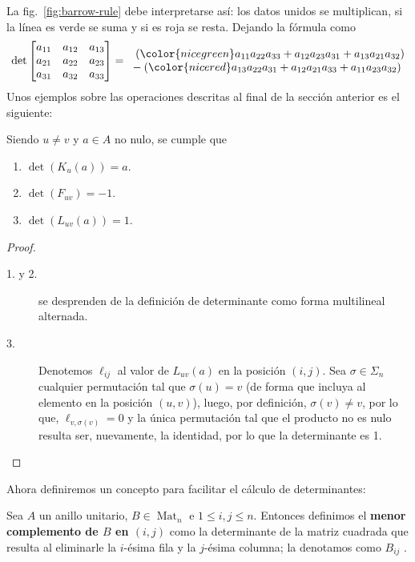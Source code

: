 \documentclass[11pt,oneside]{book}
\DeclareMathOperator{\Mat}{Mat}
\begin{document}
La fig.~\ref{fig:barrow-rule} debe interpretarse así: los datos unidos se multiplican, si la línea es verde se suma y si es roja se resta. Dejando la fórmula como
\begin{equation}
\det\begin{bmatrix}
a_{11} & a_{12} & a_{13} \\
a_{21} & a_{22} & a_{23} \\
a_{31} & a_{32} & a_{33}
\end{bmatrix}=
\begin{matrix}
\phantom{{}-}({\color{nicegreen}a_{11}a_{22}a_{33}+a_{12}a_{23}a_{31}+a_{13}a_{21}a_{32}})\\
{}-({\color{nicered}a_{13}a_{22}a_{31}+a_{12}a_{21}a_{33}+a_{11}a_{23}a_{32}})
\end{matrix}
\end{equation}
Unos ejemplos sobre las operaciones descritas al final de la sección anterior es el siguiente:
\begin{thm}
Siendo $u\neq v$ y $a\in A$ no nulo, se cumple que
	\begin{enumerate}
	\item $\det(K_u(a))=a$.
	\item $\det(F_{uv})=-1$.
	\item $\det(L_{uv}(a))=1$.
	\end{enumerate}
\end{thm}
\begin{proof}
	\begin{description}
	\item[1. y 2.] se desprenden de la definición de determinante como forma multilineal alternada.
	\item[3.] Denotemos $\ell_{ij}$ al valor de $L_{uv}(a)$ en la posición $(i,j)$. Sea $\sigma\in\Sigma_n$ cualquier permutación tal que $\sigma(u)=v$ (de forma que incluya al elemento en la posición $(u,v)$), luego, por definición, $\sigma(v)\neq v$, por lo que, $\ell_{v,\sigma(v)}=0$ y la única permutación tal que el producto no es nulo resulta ser, nuevamente, la identidad, por lo que la determinante es 1.
	\end{description}
\end{proof}
Ahora definiremos un concepto para facilitar el cálculo de determinantes:
\begin{mydef}
Sea $A$ un anillo unitario, $B\in\Mat_n$ e $1\leq i,j\leq n$. Entonces definimos el \textbf{menor complemento de $B$ en $(i,j)$} como la determinante de la matriz cuadrada que resulta al eliminarle la $i$-ésima fila y la $j$-ésima columna; la denotamos como $B_{ij}$ .
\end{mydef}
\end{document}

